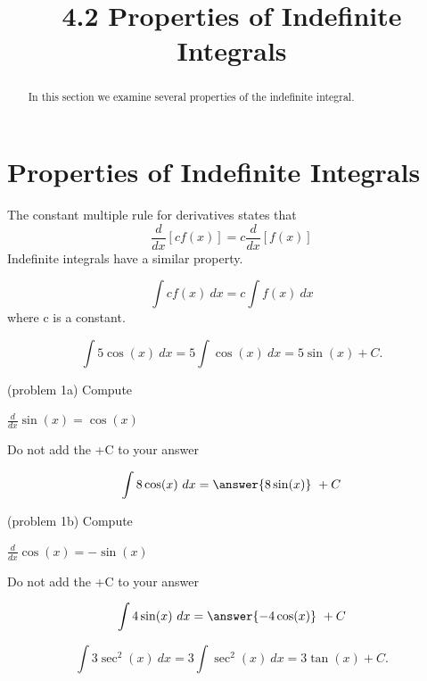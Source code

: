 \documentclass[handout]{ximera}
\title{4.2 Properties of Indefinite Integrals}
\begin{document}
\begin{abstract}
In this section we examine several properties of the indefinite integral.
\end{abstract}

\maketitle

\section{Properties of Indefinite Integrals}
The constant multiple rule for derivatives states that
\[
\frac{d}{dx}\left[cf(x)\right] = c\frac{d}{dx}\left[f(x)\right]
\]
Indefinite integrals have a similar property.
\begin{theorem}
\[\int cf(x) \ dx = c\int f(x) \ dx\]
where c is a constant.
\end{theorem}


\begin{example}[example 1]
\[
\int 5\cos(x) \ dx = 5 \int \cos(x) \ dx = 5\sin(x) +C.
\]
\end{example}


\begin{problem}(problem 1a)
Compute

\begin{hint}
$\frac{d}{dx} \sin(x) = \cos(x)$
\end{hint}
\begin{hint}
Do not add the +C to your answer
\end{hint}

\[
\int 8\cos(x) \ dx =
\answer{8\sin(x)} \ +  C
\]
\end{problem}



\begin{problem}(problem 1b)
Compute

\begin{hint}
$\frac{d}{dx} \cos(x) = -\sin(x)$
\end{hint}
\begin{hint}
Do not add the +C to your answer
\end{hint}

\[
\int 4\sin(x) \ dx =
\answer{-4\cos(x)} \ +  C
\]
\end{problem}



\begin{example}[example 2]
\[
\int 3\sec^2(x) \ dx = 3 \int \sec^2(x) \ dx = 3\tan(x) +C.
\]
\end{example}
\end{document}

